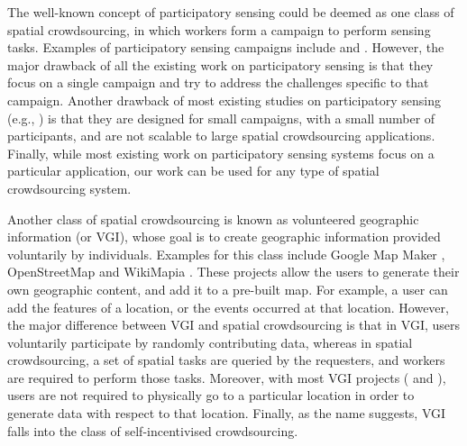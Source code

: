 \documentclass{USC-Thesis}
\numberwithin{equation}{chapter}
\begin{document}
The well-known concept of participatory sensing could be deemed as one class of spatial crowdsourcing, in which workers form a campaign to perform sensing tasks. Examples of participatory sensing campaigns include \cite{trafficucb,kazemi2011privacy,cornelius2008anonysense,hull2006cartel} and \cite{mohan2008nericell}.
However, the major drawback of all the existing work on participatory sensing is that they focus on a single campaign and try to address the challenges specific to that campaign. Another drawback of most existing studies on participatory sensing (e.g., \cite{kazemi2011privacy}) is that they are designed for small campaigns, with a small number of participants, and are not scalable to large spatial crowdsourcing applications. Finally, while most existing work on participatory sensing systems focus on a particular application, our work can be used for any type of spatial crowdsourcing system.

Another class of spatial crowdsourcing is known as volunteered geographic information (or VGI), whose goal is to create geographic information provided voluntarily by individuals. Examples for this class include Google Map Maker \cite{GMM}, OpenStreetMap \cite{OSM} and WikiMapia \cite{wikimapia}. These projects allow the users to generate their own geographic content, and add it to a pre-built map. For example, a user can add the features of a location, or the events occurred at that location. However, the major difference between VGI and spatial crowdsourcing is that in VGI, users voluntarily participate by randomly contributing data, whereas in spatial crowdsourcing, a set of spatial tasks are queried by the requesters, and workers are required to perform those tasks. Moreover, with most VGI projects (\cite{GMM} and \cite{wikimapia}), users are not required to physically go to a particular location in order to generate data with respect to that location. Finally, as the name suggests, VGI falls into the class of self-incentivised crowdsourcing.
\end{document}
